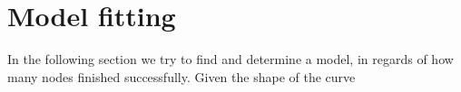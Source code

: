 


\section{Model fitting}
In the following section we try to find and determine a model, in regards of how many nodes finished successfully. Given the shape of the curve

